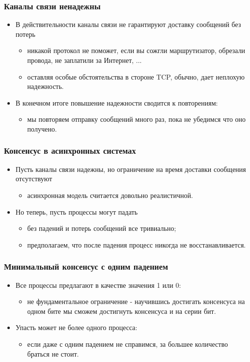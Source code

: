 \begin{frame}
\frametitle{Каналы связи ненадежны}
\begin{itemize}
  \item В действительности каналы связи не гарантируют доставку сообщений без
  потерь
  \begin{itemize}
    \item никакой протокол не поможет, если вы сожгли маршрутизатор, обрезали
    провода, не заплатили за Интернет, ...
    \item оставляя особые обстоятельства в стороне TCP, обычно, дает неплохую
    надежность.
  \end{itemize}
  \item В конечном итоге повышение надежности сводится к повторениям:
  \begin{itemize}
    \item мы повторяем отправку сообщений много раз, пока не убедимся что оно
    получено.
  \end{itemize}
\end{itemize}
\end{frame}

\begin{frame}
\frametitle{Консенсус в асинхронных системах}
\begin{itemize}
  \item Пусть каналы связи надежны, но ограничение на время доставки сообщения
  отсутствуют
  \begin{itemize}
    \item асинхронная модель считается довольно реалистичной.
  \end{itemize}
  \item Но теперь, пусть процессы могут падать
  \begin{itemize}
    \item без падений и потерь сообщений все тривиально;
    \item предполагаем, что после падения процесс никогда не восстанавливается.
  \end{itemize}
\end{itemize}
\end{frame}

\begin{frame}
\frametitle{Минимальный консенсус с одним падением}
\begin{itemize}
  \item Все процессы предлагают в качестве значения 1 или 0:
  \begin{itemize}
    \item не фундаментальное ограничение - научившись достигать консенсуса на
    одном бите мы сможем достигнуть консенсуса и на серии бит.
  \end{itemize}
  \item Упасть может не более одного процесса:
  \begin{itemize}
    \item если даже с одним падением не справимся, за большее количество браться
    не стоит.
  \end{itemize}
\end{itemize}
\end{frame}

